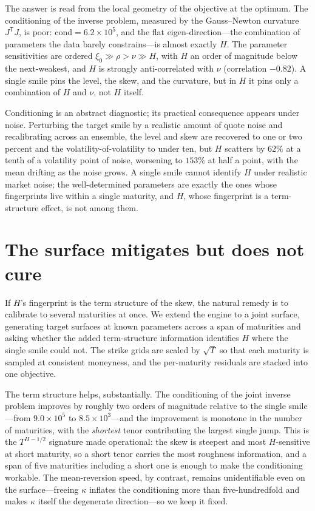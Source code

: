 \documentclass[11pt]{article}
\begin{document}
The answer is read from the local geometry of the objective at the optimum. The conditioning of
the inverse problem, measured by the Gauss--Newton curvature $J^{\mathsf T}J$, is poor:
$\mathrm{cond}=6.2\times 10^{5}$, and the flat eigen-direction---the combination of parameters
the data barely constrains---is almost exactly $H$. The parameter sensitivities are ordered
$\xi_0 \gg \rho > \nu \gg H$, with $H$ an order of magnitude below the next-weakest, and $H$ is
strongly anti-correlated with $\nu$ (correlation $-0.82$). A single smile pins the level, the
skew, and the curvature, but in $H$ it pins only a combination of $H$ and $\nu$, not $H$ itself.

Conditioning is an abstract diagnostic; its practical consequence appears under noise. Perturbing
the target smile by a realistic amount of quote noise and recalibrating across an ensemble, the
level and skew are recovered to one or two percent and the volatility-of-volatility to under ten,
but $H$ scatters by $62\%$ at a tenth of a volatility point of noise, worsening to $153\%$ at half
a point, with the mean drifting as the noise grows. A single smile cannot identify $H$ under
realistic market noise; the well-determined parameters are exactly the ones whose fingerprints
live within a single maturity, and $H$, whose fingerprint is a term-structure effect, is not
among them.

\section{The surface mitigates but does not cure}\label{sec:surface}

If $H$'s fingerprint is the term structure of the skew, the natural remedy is to calibrate to
several maturities at once. We extend the engine to a joint surface, generating target surfaces
at known parameters across a span of maturities and asking whether the added term-structure
information identifies $H$ where the single smile could not. The strike grids are scaled by
$\sqrt{T}$ so that each maturity is sampled at consistent moneyness, and the per-maturity residuals
are stacked into one objective.

The term structure helps, substantially. The conditioning of the joint inverse problem improves by
roughly two orders of magnitude relative to the single smile---from $9.0\times 10^{5}$ to
$8.5\times 10^{3}$---and the improvement is monotone in the number of maturities, with the
\emph{shortest} tenor contributing the largest single jump. This is the $T^{H-1/2}$ signature made
operational: the skew is steepest and most $H$-sensitive at short maturity, so a short tenor carries
the most roughness information, and a span of five maturities including a short one is enough to make
the conditioning workable. The mean-reversion speed, by contrast, remains unidentifiable even on the
surface---freeing $\kappa$ inflates the conditioning more than five-hundredfold and makes $\kappa$
itself the degenerate direction---so we keep it fixed.
\end{document}

